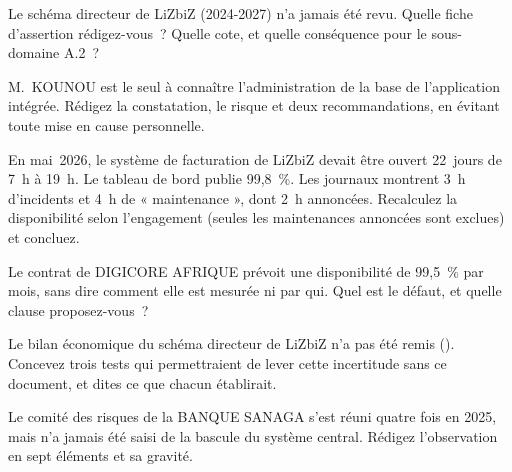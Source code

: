 \begin{boxexo}[title={\ding{45}\quad Exercice~17.5. Un schéma directeur \niveaumoyen}]
Le schéma directeur de LiZbiZ (2024-2027) n'a jamais été revu. Quelle
fiche d'assertion rédigez-vous~? Quelle cote, et quelle conséquence pour
le sous-domaine A.2~?
\end{boxexo}

\begin{boxexo}[title={\ding{45}\quad Exercice~17.6. La dépendance à une personne \niveaumoyen}]
M.~KOUNOU est le seul à connaître l'administration de la base de
l'application intégrée. Rédigez la constatation, le risque et deux
recommandations, en évitant toute mise en cause personnelle.
\end{boxexo}

\begin{boxexo}[title={\ding{45}\quad Exercice~17.7. Recalculer une disponibilité \niveaumoyen}]
En mai~2026, le système de facturation de LiZbiZ devait être ouvert
22~jours de 7~h à 19~h. Le tableau de bord publie 99,8~\%. Les journaux
montrent 3~h d'incidents et 4~h de « maintenance », dont 2~h annoncées.
Recalculez la disponibilité selon l'engagement (seules les maintenances
annoncées sont exclues) et concluez.
\end{boxexo}

\begin{boxexo}[title={\ding{45}\quad Exercice~17.8. L'engagement de DIGICORE \niveaumoyen}]
Le contrat de DIGICORE AFRIQUE prévoit une disponibilité de 99,5~\% par
mois, sans dire comment elle est mesurée ni par qui. Quel est le défaut, et
quelle clause proposez-vous~?
\end{boxexo}

\begin{boxexo}[title={\ding{45}\quad Exercice~17.9. Le budget informatique \niveauexpert}]
Le bilan économique du schéma directeur de LiZbiZ n'a pas été remis
(\NEK{}). Concevez trois tests qui permettraient de lever cette incertitude
sans ce document, et dites ce que chacun établirait.
\end{boxexo}

\begin{boxexo}[title={\ding{45}\quad Exercice~17.10. Une gouvernance de façade \niveauexpert}]
Le comité des risques de la BANQUE SANAGA s'est réuni quatre fois en 2025,
mais n'a jamais été saisi de la bascule du système central. Rédigez
l'observation en sept éléments et sa gravité.
\end{boxexo}

